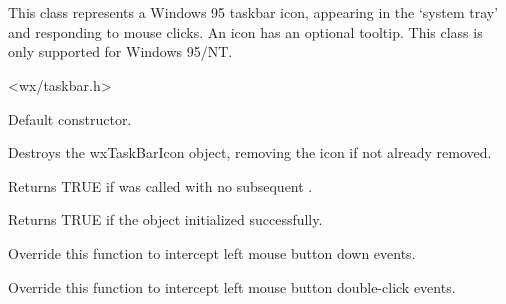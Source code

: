 \section{}\label{wxtaskbaricon}

This class represents a Windows 95 taskbar icon, appearing in the `system tray' and responding to
mouse clicks. An icon has an optional tooltip. This class is only supported for Windows 95/NT.




<wx/taskbar.h>


\label{wxtaskbariconconstr}


Default constructor.



Destroys the wxTaskBarIcon object, removing the icon if not already removed.

\label{wxtaskbariconisiconinstalled}


Returns TRUE if  was called with no subsequent .

\label{wxtaskbariconisok}


Returns TRUE if the object initialized successfully.

\label{wxtaskbaricononlbuttondown}


Override this function to intercept left mouse button down events.

\label{wxtaskbaricononlbuttondclick}


Override this function to intercept left mouse button double-click events.

